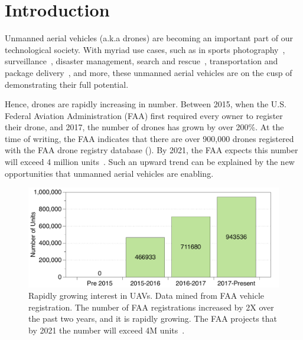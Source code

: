
\section{Introduction}

Unmanned aerial vehicles (a.k.a drones) are becoming an important part of our technological society. With myriad use cases, such as in sports photography~\cite{drone-sports1}, surveillance~\cite{drone-surveillance}, disaster management, search and rescue~\cite{disaster-drone,nepal-earthquake-drone}, transportation and package delivery~\cite{Amazondel:online,CSD-Amazon-Drone-patents,drone-package-delivery-google}, and more, these unmanned aerial vehicles are on the cusp of demonstrating their full potential. 

Hence, drones are rapidly increasing in number. Between 2015, when the U.S. Federal Aviation Administration (FAA) first required every owner to register their drone, and 2017, the number of drones has grown by over 200\%. At the time of writing, the FAA indicates that there are over 900,000 drones registered with the FAA drone registry database (). By 2021, the FAA expects this number will exceed 4 million units~\cite{faa-2021}. Such an upward trend can be explained by the new opportunities that unmanned aerial vehicles are enabling.


\begin{figure}[t!]
  \includegraphics[trim=0 0 0 -10, clip, width=1.0\columnwidth]{figs/faa}
  \caption{Rapidly growing interest in UAVs. Data mined from FAA vehicle registration. The number of FAA registrations increased by 2X over the past two years, and it is rapidly growing. The FAA projects that by 2021 the number will exceed 4M units~\cite{FAA:online}.}
  \label{fig:faa-registrations}
\end{figure}


